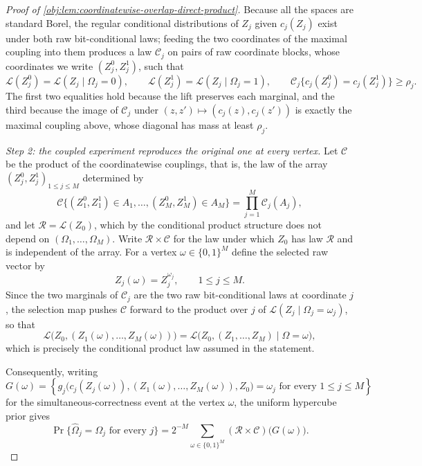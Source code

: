 \begin{proof}[Proof of \cref{obj:lem:coordinatewise-overlap-direct-product}]
Because all the spaces are standard Borel, the regular conditional distributions of \(Z_j\) given \(c_j(Z_j)\) exist under both raw bit-conditional laws; feeding the two coordinates of the maximal coupling into them produces a law \(\mathcal C_j\) on pairs of raw coordinate blocks, whose coordinates we write \((Z_j^0,Z_j^1)\), such that
\[
\mathcal L(Z_j^0)=\mathcal L(Z_j\mid\Omega_j=0),
\qquad
\mathcal L(Z_j^1)=\mathcal L(Z_j\mid\Omega_j=1),
\qquad
\mathcal C_j\bigl\{c_j(Z_j^0)=c_j(Z_j^1)\bigr\}\geq\rho_j .
\]
The first two equalities hold because the lift preserves each marginal, and the third because the image of \(\mathcal C_j\) under \((z,z')\mapsto(c_j(z),c_j(z'))\) is exactly the maximal coupling above, whose diagonal has mass at least \(\rho_j\).

\emph{Step 2: the coupled experiment reproduces the original one at every vertex.}
Let \(\mathcal C\) be the product of the coordinatewise couplings, that is, the law of the array \((Z_j^0,Z_j^1)_{1\leq j\leq M}\) determined by
\[
\mathcal C\bigl\{(Z_1^0,Z_1^1)\in A_1,\ldots,(Z_M^0,Z_M^1)\in A_M\bigr\}
=\prod_{j=1}^M\mathcal C_j(A_j),
\]
and let \(\mathcal R=\mathcal L(Z_0)\), which by the conditional product structure does not depend on \((\Omega_1,\ldots,\Omega_M)\). Write \(\mathcal R\times\mathcal C\) for the law under which \(Z_0\) has law \(\mathcal R\) and is independent of the array. For a vertex \(\omega\in\{0,1\}^M\) define the selected raw vector by
\[
Z_j(\omega)=Z_j^{\omega_j},
\qquad 1\leq j\leq M .
\]
Since the two marginals of \(\mathcal C_j\) are the two raw bit-conditional laws at coordinate \(j\), the selection map pushes \(\mathcal C\) forward to the product over \(j\) of \(\mathcal L(Z_j\mid\Omega_j=\omega_j)\), so that
\[
\mathcal L\bigl(Z_0,(Z_1(\omega),\ldots,Z_M(\omega))\bigr)
=
\mathcal L\bigl(Z_0,(Z_1,\ldots,Z_M)\mid\Omega=\omega\bigr),
\]
which is precisely the conditional product law assumed in the statement.

Consequently, writing
\[
G(\omega)
=
\left\{
g_j\bigl(c_j(Z_j(\omega)),(Z_1(\omega),\ldots,Z_M(\omega)),Z_0\bigr)=\omega_j
\text{ for every }1\leq j\leq M
\right\}
\]
for the simultaneous-correctness event at the vertex \(\omega\), the uniform hypercube prior gives
\[
\Pr\{\widehat\Omega_j=\Omega_j\text{ for every }j\}
=
2^{-M}\sum_{\omega\in\{0,1\}^M}(\mathcal R\times\mathcal C)\bigl(G(\omega)\bigr).
\]


\end{proof}
